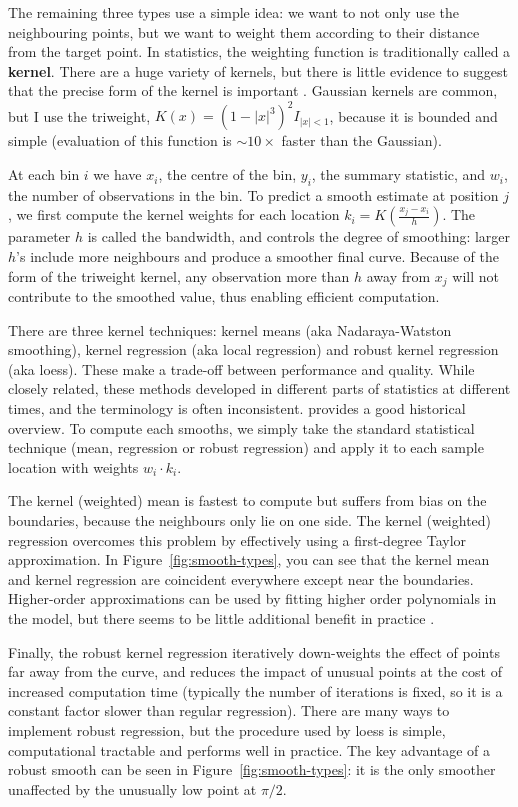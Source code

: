 \documentclass[journal]{vgtc}                %
\begin{document}
The remaining three types use a simple idea: we want to not only use the neighbouring points, but we want to weight them according to their distance from the target point. In statistics, the weighting function is traditionally called a {\bf kernel}. There are a huge variety of kernels, but there is little evidence to suggest that the precise form of the kernel is important \citep{cleveland:1996}. Gaussian kernels are common, but I use the triweight, $K(x) = (1 - |x|^3)^2 I_{|x| < 1}$, because it is bounded and simple (evaluation of this function is $\sim 10 \times$ faster than the Gaussian).  

At each bin $i$ we have $x_i$, the centre of the bin, $y_i$, the summary statistic, and $w_i$, the number of observations in the bin. To predict a smooth estimate at position $j$, we first compute the kernel weights for each location $k_i = K(\frac{x_j - x_i}{h})$. The parameter $h$ is called the bandwidth, and controls the degree of smoothing: larger $h$'s include more neighbours and produce a smoother final curve. Because of the form of the triweight kernel, any observation more than $h$ away from $x_j$ will not contribute to the smoothed value, thus enabling efficient computation. 

There are three kernel techniques: kernel means (aka Nadaraya-Watston smoothing), kernel regression (aka local regression) and robust kernel regression (aka loess). These make a trade-off between performance and quality. While closely related, these methods developed in different parts of statistics at different times, and the terminology is often inconsistent. \citep{cleveland:1996} provides a good historical overview. To compute each smooths, we simply take the standard statistical technique (mean, regression or robust regression) and apply it to each sample location with weights $w_i \cdot k_i$. 

The kernel (weighted) mean is fastest to compute but suffers from bias on the boundaries, because the neighbours only lie on one side. The kernel (weighted) regression overcomes this problem by effectively using a first-degree Taylor approximation. In Figure~\ref{fig:smooth-types}, you can see that the kernel mean and kernel regression are coincident everywhere except near the boundaries. Higher-order approximations can be used by fitting higher order polynomials in the model, but there seems to be little additional benefit in practice \citep{cleveland:1996}.

Finally, the robust kernel regression iteratively down-weights the effect of points far away from the curve, and reduces the impact of unusual points at the cost of increased computation time (typically the number of iterations is fixed, so it is a constant factor slower than regular regression). There are many ways to implement robust regression, but the procedure used by loess \citep{cleveland:1979} is simple, computational tractable and performs well in practice. The key advantage of a robust smooth can be seen in Figure~\ref{fig:smooth-types}: it is the only smoother unaffected by the unusually low point at $\pi / 2$.
\end{document}
